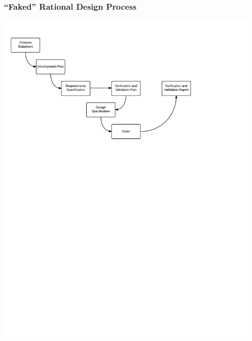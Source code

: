 \documentclass{beamer}
\begin{document}

\begin{frame}

\frametitle{``Faked'' Rational Design Process}

\begin{center}
\includegraphics[scale=0.6]{OverviewOfProcess.pdf}
\end{center}

\end{frame}

\end{document}
